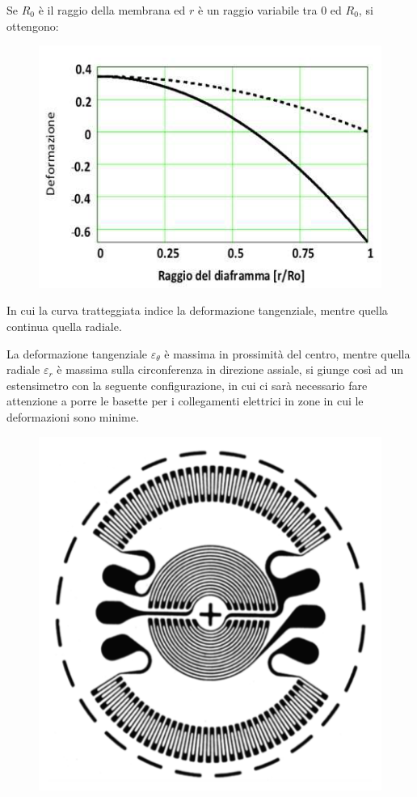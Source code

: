 \documentclass[a4paper, 15pt]{article}
\begin{document}
\begin{adjustwidth}{2in}{}
 		Se $R_0$ è il raggio della membrana ed $r$ è un raggio variabile tra $0$ ed $R_0$, si ottengono:
 		\begin{figure}[H]
 			\centering
 			\includegraphics[width=0.4\linewidth]{immagini/manometro12}
 			\label{fig:manometro12}
 		\end{figure}
 		In cui la curva tratteggiata indice la deformazione tangenziale, mentre quella continua quella radiale. \newline 
 		
 		La deformazione tangenziale $\varepsilon_\theta$ è massima in prossimità del centro, mentre quella radiale $\varepsilon_r$ è massima sulla circonferenza in direzione assiale, si giunge così ad un estensimetro con la seguente configurazione, in cui ci sarà necessario fare attenzione a porre le basette per i collegamenti elettrici in zone in cui le deformazioni sono minime.
 		\begin{figure}[H]
 			\centering
 			\includegraphics[width=0.3\linewidth]{immagini/manometro13}
 			\label{fig:manometro13}
 		\end{figure}
\end{adjustwidth}
\newpage
\end{document}
